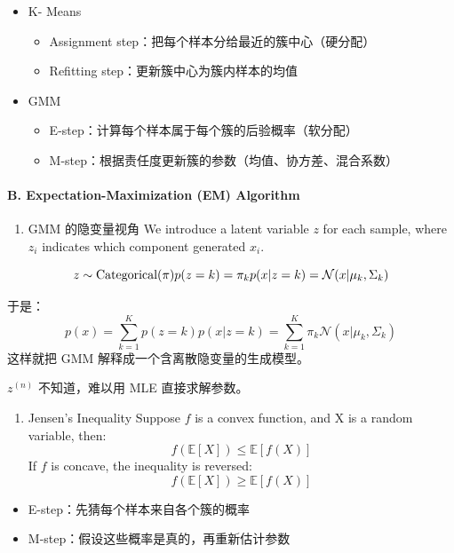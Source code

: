\documentclass[
]{ctexart}
\providecommand{\tightlist}{%
  \setlength{\itemsep}{0pt}\setlength{\parskip}{0pt}}
\begin{document}
\begin{itemize}
\tightlist
\item
  K- Means

  \begin{itemize}
  \tightlist
  \item
    Assignment step：把每个样本分给最近的簇中心（硬分配）
  \item
    Refitting step：更新簇中心为簇内样本的均值
  \end{itemize}
\item
  GMM

  \begin{itemize}
  \tightlist
  \item
    E-step：计算每个样本属于每个簇的后验概率（软分配）
  \item
    M-step：根据责任度更新簇的参数（均值、协方差、混合系数）
  \end{itemize}
\end{itemize}

\paragraph{B. Expectation-Maximization (EM)
Algorithm}\label{b.-expectation-maximization-em-algorithm}

\begin{enumerate}
\def\labelenumi{\arabic{enumi}.}
\tightlist
\item
  GMM 的隐变量视角 We introduce a latent variable \(z\) for each sample,
  where \(z_i\) indicates which component generated \(x_i\).
\end{enumerate}

\[z \sim \text{Categorical}(\pi) \\
p(z = k) = \pi_k \\
p(x|z=k) = \mathcal{N}(x|\mu_k, \Sigma_k)\]

于是：
\[p(x) = \sum_{k=1}^K p(z=k) p(x|z=k) = \sum_{k=1}^K \pi_k \mathcal{N}(x|\mu_k, \Sigma_k)\]
这样就把 GMM 解释成一个含离散隐变量的生成模型。

\(z^{(n)}\) 不知道，难以用 MLE 直接求解参数。

\begin{enumerate}
\def\labelenumi{\arabic{enumi}.}
\setcounter{enumi}{1}
\tightlist
\item
  Jensen's Inequality Suppose \(f\) is a convex function, and X is a
  random variable, then: \[f(\mathbb{E}[X]) \leq \mathbb{E}[f(X)]\] If
  \(f\) is concave, the inequality is reversed:
  \[f(\mathbb{E}[X]) \geq \mathbb{E}[f(X)]\]
\end{enumerate}

\begin{itemize}
\tightlist
\item
  E-step：先猜每个样本来自各个簇的概率
\item
  M-step：假设这些概率是真的，再重新估计参数
\end{itemize}
\end{document}
